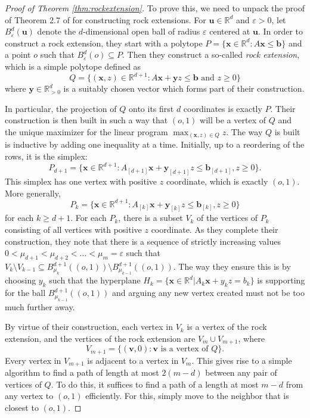 \documentclass[centering,11pt,reqno]{amsart}
\theoremstyle{definition}
\begin{document}
\begin{proof}[Proof of Theorem \ref{thm:rockextension}]
To prove this, we need to unpack the proof of Theorem 2.7 of \cite{RockExtensions} for constructing rock extensions. For $\mathbf{u} \in \mathbb{R}^{d}$ and $\varepsilon > 0$, let $B_{\varepsilon}^{d}(\mathbf{u})$ denote the $d$-dimensional open ball of radius $\varepsilon$ centered at $\mathbf{u}$. In order to construct a rock extension, they start with a polytope $P = \{\mathbf{x} \in \mathbb{R}^{d}: A\mathbf{x} \leq \mathbf{b}\}$ and a point $o$ such that $B_{\varepsilon}^{d}(o) \subseteq P$. Then they construct a so-called \emph{rock extension}, which is a simple polytope defined as
\[Q = \{(\mathbf{x},z) \in \mathbb{R}^{d+1}: A \mathbf{x} + \mathbf{y}z \leq \mathbf{b} \text{ and } z \geq 0\}\] where $\mathbf{y}\in \mathbb{R}_{>0}^d$ is a suitably chosen vector which forms part of their construction.

In particular, the projection of $Q$ onto its first $d$ coordinates is exactly $P$. Their construction is then built in such a way that $(o, 1)$ will be a vertex of $Q$ and the unique maximizer for the linear program $\max_{(\mathbf{x},z)\in Q} z$. The way $Q$ is built is inductive by adding one inequality at a time. Initially, up to a reordering of the rows, it is the simplex: 
\[P_{d+1} = \{\mathbf{x} \in \mathbb{R}^{d+1}: A_{[d+1]}\mathbf{x} + \mathbf{y}_{[d+1]} z \leq \mathbf{b}_{[d+1]}, z \geq 0\}.\]
This simplex has one vertex with positive $z$ coordinate, which is exactly $(o,1)$. More generally, 
\[P_{k} = \{\mathbf{x} \in \mathbb{R}^{d+1}: A_{[k]}\mathbf{x} + \mathbf{y}_{[k]} z \leq \mathbf{b}_{[k]}, z \geq 0\}\]
for each $k \geq d+1$. For each $P_{k}$, there is a subset $V_{k}$ of the vertices of $P_{k}$ consisting of all vertices with positive $z$ coordinate. As they complete their construction, they note that there is a sequence of strictly increasing values $0 < \mu_{d+1} < \mu_{d+2} < \dots < \mu_{m} = \varepsilon$ such that $V_{k} \setminus V_{k-1} \subseteq  B_{\mu_{k}}^{d+1}((o,1)) \setminus B_{\mu_{k-1}}^{d+1}((o,1))$. The way they ensure this is by choosing $y_{k}$ such that the hyperplane $H_{k} = \{\mathbf{x} \in \mathbb{R}^{d}| A_{k}\mathbf{x} + y_{k} z= b_{k}\}$ is supporting for the ball $B_{\mu_{k-1}}^{d+1}((o,1))$ and arguing any new vertex created must not be too much further away. 

By virtue of their construction, each vertex in $V_{k}$ is a vertex of the rock extension, and the vertices of the rock extension are $V_{m} \cup V_{m+1}$, where 
\[V_{m+1} = \{(\mathbf{v},0): \mathbf{v} \text{ is a vertex of } Q\}.\]
Every vertex in $V_{m+1}$ is adjacent to a vertex in $V_{m}$. This gives rise to a simple algorithm to find a path of length at most $2(m-d)$ between any pair of vertices of $Q$. To do this, it suffices to find a path of a length at most $m-d$ from any vertex to $(o,1)$ efficiently. For this, simply move to the neighbor that is closest to $(o,1)$. 


\end{proof}
\end{document}
